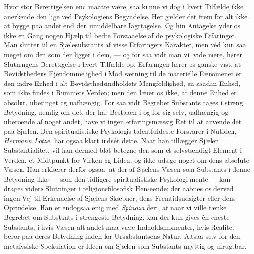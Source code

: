 \documentclass[12pt,a4paper,openany]{book}
\newcommand{\opage}[1]{\marginnote{\footnotesize\textit{[#1]}}}
\begin{document}
Hvor stor Berettigelsen end maatte være, saa kunne vi dog i hvert
Tilfælde ikke anerkende den lige ved Psykologiens Begyndelse. Her gælder
det frem for alt ikke at bygge paa andet end den umiddelbare
Iagttagelse. Og hin Antagelse yder os ikke en Gang nogen Hjælp til bedre
Forstaaelse af de psykologiske Erfaringer. Man slutter til en
Sjælesubstants af visse Erfaringers Karakter, men véd kun saa meget om
den som der ligger i dem, --- og for saa vidt man vil vide mere, hører
Slutningens Berettigelse i hvert Tilfælde op. Erfaringen lærer os ganske
vist, at Bevidsthedens Ejendommelighed i Mod%
\opage{15}sætning til de materielle Fænomener er den indre Enhed i alt
Bevidsthedsindholdets Mangfoldighed, en saadan Enhed, som ikke findes i
Rummets Verden; men den lærer os ikke, at denne Enhed er absolut,
ubetinget og uafhængig. For saa vidt Begrebet Substants tages i streng
Betydning, nemlig om det, der har Bestaaen i og for sig selv, uafhængig
og uberoende af noget andet, have vi ingen erfaringsmæssig Ret til at
anvende det paa Sjælen. Den spiritualistiske Psykologis talentfuldeste
Forsvarer i Nutiden, \emph{Hermann Lotze}, har ogsaa klart indsét dette.
Naar han tillægger Sjælen Substantialitet, vil han dermed blot betegne
den som et selvstændigt Element i Verden, et Midtpunkt for Virken og
Liden, og ikke udsige noget om dens absolute Væsen. Han erklærer derfor
ogsaa, at der af Sjælens Væsen som Substants i denne Betydning ikke ---
som den tidligere spiritualistiske Psykologi mente --- kan drages videre
Slutninger i religionsfilosofisk Henseende; der aabnes os derved ingen
Vej til Erkendelse af Sjælens Skæbner, dens Fremtidsudsigter eller dens
Oprindelse. Han er endogsaa enig med \emph{Spinoza} deri, at naar vi
ville tænke Begrebet om Substants i strengeste Betydning, kan der kun
gives én eneste Substants, i hvis Væsen alt andet maa være
Indholdsmomenter, hvis Realitet beror paa deres Betydning inden for
Ursubstantsens Natur. Altsaa selv for den metafysiske Spekulation er
Ideen om Sjælen som Substants unyttig og ufrugtbar.
\end{document}
